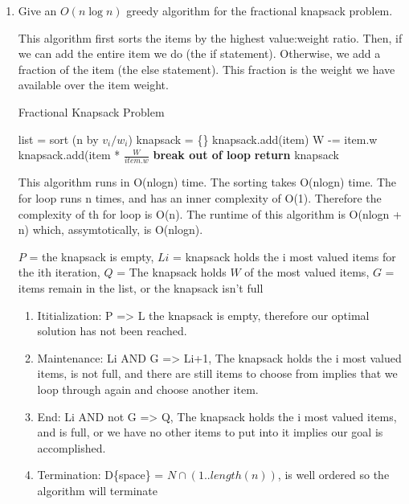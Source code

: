 \documentclass{article}
\begin{document}
\begin{enumerate}
    \item Give an $O(n\log n)$ greedy algorithm for the fractional knapsack problem.
      
This algorithm first sorts the items by the highest value:weight ratio. Then, if we can add the entire item we do (the if statement). Otherwise, we add a fraction of the item (the else statement). This fraction is the weight we have available over the item weight. 

\begin{algorithm}
    \caption{Fractional Knapsack Problem}\label{fracKnap}
    \begin{algorithmic}[1]
      \State list = sort (n by $v_i/w_i$)
      \State knapsack = \{\}
      		\State knapsack.add(item)
      		\State W -= item.w
      	\Else
      		\State knapsack.add(item * $\frac{W}{item.w}$
      		\State \textbf{break out of loop}
      	\EndIf
      \EndFor
      \State \textbf{return} knapsack
    \EndFunction
    \end{algorithmic}
\end{algorithm} 

This algorithm runs in O(nlogn) time. The sorting takes O(nlogn) time. The for loop runs n times, and has an inner complexity of O(1). Therefore the complexity of th for loop is O(n). The runtime of this algorithm is O(nlogn + n) which, assymtotically, is O(nlogn).

$P$ = the knapsack is empty, $Li$ = knapsack holds the i most valued items for the ith iteration, $Q$ = The knapsack holds $W$ of the most valued items, $G$ = items remain in the list, or the knapsack isn't full
    \begin{enumerate}
        \item Ititialization: P => L the knapsack is empty, therefore our optimal solution has not been reached.
        \item Maintenance: Li AND G => Li+1, The knapsack holds the i most valued items, is not full, and there are still items to choose from implies that we loop through again and choose another item.
        \item End: Li AND not G => Q, The knapsack holds the i most valued items, and is full, or we have no other items to put into it implies our goal is accomplished.
        \item Termination: D\{space\} = $N \cap(1..length(n))$, is well ordered so the algorithm will terminate
    \end{enumerate}
    

\end{enumerate}
\end{document}

